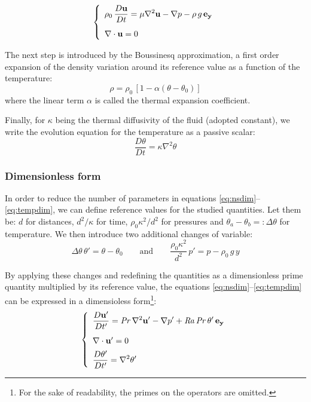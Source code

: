 \documentclass[12pt,oneside]{article}
\newcommand{\DDt}[1]{\displaystyle\frac{D {#1}}{D t}} 					%
\newcommand{\divergence}[1]{\nabla\cdot{#1}} 							%
\newcommand{\gradient}[1]{\nabla{#1}} 									%
\newcommand{\laplacian}[1]{\nabla^2{#1}} 								%
\newcommand\Pra{\mbox{\textit{Pr}}} 									%
\newcommand\Ray{\mbox{\textit{Ra}}}  									%
\begin{document}
\begin{equation}\nonumber\label{eq:nsdim}\left\{
\begin{array}{l}
\rho_0 \,\displaystyle\frac{D\bf{u}}{Dt} = \mu \laplacian{\bf{u}} - \gradient{p} - \rho \, g \, \bf{e_y} \\[12pt]
\divergence{\bf{u}}=0
\end{array}\right.
\end{equation}


The next step is introduced by the Boussinesq approximation, a first order expansion of the density variation around its reference value as a function of the temperature:
\begin{equation}
\rho = \rho_0 \, [1 - \alpha (\theta - \theta_0)]
\end{equation}
where the linear term $\alpha$ is called the thermal expansion coefficient.

Finally, for $\kappa$ being the thermal diffusivity of the fluid (adopted constant), we write the evolution equation for the temperature as a passive scalar:
\begin{equation}\label{eq:tempdim}
\DDt{\theta} = \kappa \laplacian{\theta}
\end{equation}


\subsubsection{Dimensionless form}

In order to reduce the number of parameters in equations \ref{eq:nsdim}--\ref{eq:tempdim}, we can define reference values for the studied quantities. Let them be: $d$ for distances, $d^2/\kappa$ for time, $\rho_0 \kappa^2 / d^2$ for pressures and $\theta_a-\theta_b =: \Delta \theta$ for temperature. We then introduce two additional changes of variable:
$$ \Delta \theta \, \theta' = \theta - \theta_0 \qquad
\text{and}
\qquad \frac{\rho_0 \kappa^2}{d^2} \, p' = p - \rho_0 \, g \, y $$

By applying these changes and redefining the quantities as a dimensionless prime quantity multiplied by its reference value, the equations \ref{eq:nsdim}--\ref{eq:tempdim} can be expressed in a dimensioless form\footnote{For the sake of readability, the primes on the operators are omitted.}:
\begin{equation}\label{eq:dimless}\left\{
\begin{array}{l}
\displaystyle\frac{D\bf{u'}}{Dt'} = \Pra \, \laplacian{\bf{u'}} - \gradient{p'} + \Ray \, \Pra \, \theta' \, \bf{e_y} \\[12pt]
\divergence{\bf{u'}}=0 \\[5pt]
\displaystyle\frac{D\theta'}{Dt'} = \laplacian{\theta'}
\end{array}\right.
\end{equation}
\end{document}
